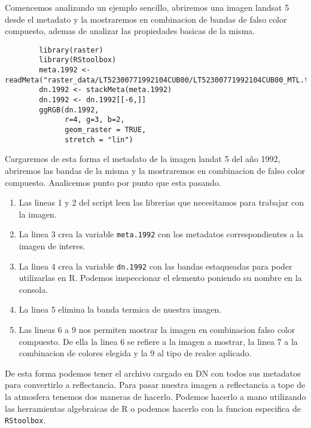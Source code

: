 \documentclass[a4paper]{article}
\begin{document}
\begin{exa}
   Comencemos analizando un ejemplo sencillo, abriremos una imagen landsat 5
    desde el metadato y la mostraremos en combinacion de bandas de falso color
    compuesto, ademas de analizar las propiedades basicas de la misma.
    \begin{lstlisting}
        library(raster)
        library(RStoolbox)
        meta.1992 <- readMeta("raster_data/LT52300771992104CUB00/LT52300771992104CUB00_MTL.txt")
        dn.1992 <- stackMeta(meta.1992)
        dn.1992 <- dn.1992[[-6,]]
        ggRGB(dn.1992, 
              r=4, g=3, b=2, 
              geom_raster = TRUE, 
              stretch = "lin")
    \end{lstlisting}
    
    Cargaremos de esta forma el metadato de la imagen landat 5 del año 1992,
    abriremos las bandas de la misma y la mostraremos en combinacion de falso
    color compuesto. Analicemos punto por punto que esta pasando.
    \begin{enumerate}
        \item Las lineas 1 y 2 del script leen las librerias que necesitamos
            para trabajar con la imagen.
        \item La linea 3 crea la variable \texttt{meta.1992} con los metadatos
            correspondientes a la imagen de interes.
        \item La linea 4 crea la variable \texttt{dn.1992} con las bandas
            estaqueadas para poder utilizarlas en R. Podemos inspeccionar el
            elemento poniendo su nombre en la consola.
        \item La linea 5 elimina la banda termica de nuestra imagen.
        \item Las lineas 6 a 9 nos permiten mostrar la imagen en combinacion
            falso color compuesto. De ella la linea 6 se refiere a la imagen a
            mostrar, la linea 7 a la combinacion de colores elegida y la 9 al
            tipo de realce aplicado.
    \end{enumerate}
\end{exa}

De esta forma podemos tener el archivo cargado en DN con todos sus metadatos
para convertirlo a reflectancia. Para pasar nuestra imagen a reflectancia a tope
de la atmosfera tenemos dos maneras de hacerlo. Podemos hacerlo a mano
utilizando las herramientas algebraicas de R o podemos hacerlo con la funcion
especifica de \texttt{RStoolbox}.
\end{document}
